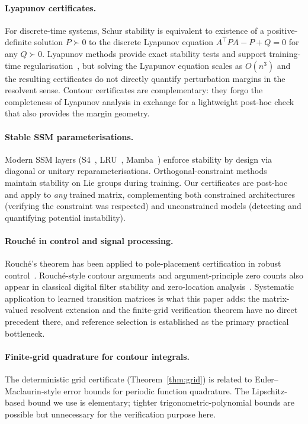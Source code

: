 \documentclass{article}
\theoremstyle{definition}
\begin{document}
\paragraph{Lyapunov certificates.}
For discrete-time systems, Schur stability is equivalent to existence of a
positive-definite solution $P \succ 0$ to the discrete Lyapunov equation
$A^\top P A - P + Q = 0$ for any $Q \succ 0$.  Lyapunov methods provide exact
stability tests and support training-time regularisation~\cite{miller2019stable},
but solving the Lyapunov equation scales as $O(n^3)$ and the resulting
certificates do not directly quantify perturbation margins in the resolvent
sense.  Contour certificates are complementary: they forgo the completeness of
Lyapunov analysis in exchange for a lightweight post-hoc check that also
provides the margin geometry.

\paragraph{Stable SSM parameterisations.}
Modern SSM layers (S4~\cite{gu2022s4}, LRU~\cite{smith2023lru},
Mamba~\cite{gu2023mamba}) enforce stability by design via diagonal or unitary
reparameterisations.  Orthogonal-constraint methods~\cite{lezcano2019cheap}
maintain stability on Lie groups during training.  Our certificates are
post-hoc and apply to \emph{any} trained matrix, complementing both
constrained architectures (verifying the constraint was respected) and
unconstrained models (detecting and quantifying potential instability).

\paragraph{Rouch\'e in control and signal processing.}
Rouch\'e's theorem has been applied to pole-placement certification in
robust control~\cite{bhattacharyya1995robust}.
Rouch\'e-style contour arguments and argument-principle zero counts also
appear in classical digital filter stability and zero-location
analysis~\cite{oppenheim1999dsp,proakis2006dsp}.  Systematic application to learned transition matrices is what this
paper adds: the matrix-valued resolvent extension and the finite-grid
verification theorem have no direct precedent there, and reference selection
is established as the primary practical bottleneck.

\paragraph{Finite-grid quadrature for contour integrals.}
The deterministic grid certificate (Theorem~\ref{thm:grid}) is related to
Euler--Maclaurin-style error bounds for periodic function quadrature.  The
Lipschitz-based bound we use is elementary; tighter trigonometric-polynomial
bounds are possible but unnecessary for the verification purpose here.
\end{document}
